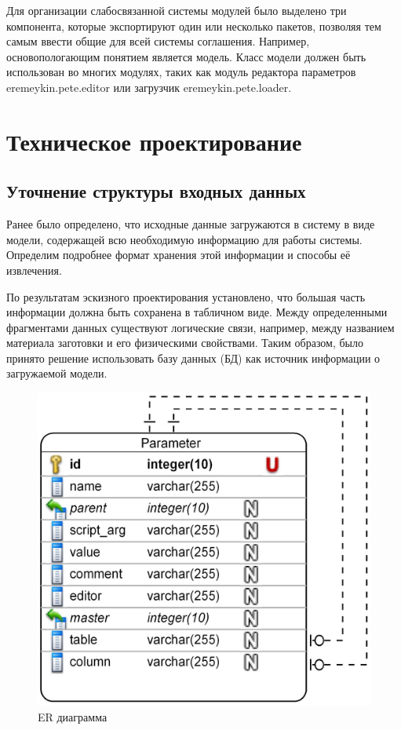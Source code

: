 \documentclass[14pt,oneside,final]{extreport}
\begin{document}
	Для организации слабосвязанной системы модулей было выделено три компонента, которые  экспортируют один или несколько пакетов, позволяя тем самым ввести общие для всей системы соглашения. Например, основопологающим понятием является модель. Класс модели должен быть использован во многих модулях, таких как модуль редактора параметров eremeykin.pete.editor или загрузчик eremeykin.pete.loader.  
	
	\chapter{Техническое проектирование}
	\section{Уточнение структуры входных данных}
	Ранее было определено, что исходные данные загружаются в систему в виде модели, содержащей всю необходимую информацию для работы системы. Определим подробнее формат хранения этой информации и способы её извлечения. 
	
	По результатам эскизного проектирования установлено, что большая часть информации должна быть сохранена в табличном виде. Между определенными фрагментами данных существуют логические связи, например, между названием материала заготовки и его физическими свойствами. Таким образом, было принято решение  использовать базу данных (БД) как источник информации о загружаемой модели. 
		
	\begin{figure}[h!]
		\begin{center}
			\includegraphics[scale=0.2]{img/ER-diagram} 
		\end{center}
		\caption{ER диаграмма}
		\label{fig:er-diagram}
	\end{figure}
		
\end{document}
